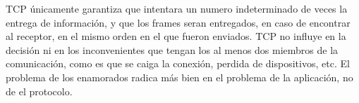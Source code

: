 \documentclass[8pt, letterpaper]{article}
\begin{document}
\begin{enumerate}
      \hfill\break
      TCP únicamente garantiza que intentara un numero indeterminado de veces
      la entrega de información, y que los frames seran entregados, en caso
      de encontrar al receptor, en el mismo orden en el que fueron enviados.
      TCP no influye en la decisión ni en los inconvenientes que tengan los
      al menos dos miembros de la comunicación, como es que se caiga la
      conexión, perdida de dispositivos, etc. El problema de los enamorados
      radica más bien en el problema de la aplicación, no de el protocolo.
\end{enumerate}
\end{document}
